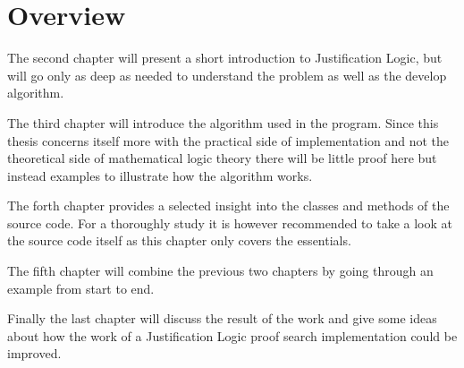 \section{Overview}
The second chapter will present a short introduction to Justification Logic, but will go only as deep as needed to understand the problem as well as the develop algorithm.
\par
The third chapter will introduce the algorithm used in the program. Since this thesis concerns itself more with the practical side of implementation and not the theoretical side of mathematical logic theory there will be little proof here but instead examples to illustrate how the algorithm works.
\par
The forth chapter provides a selected insight into the classes and methods of the source code. For a thoroughly study it is however recommended to take a look at the source code itself as this chapter only covers the essentials. 
\par
The fifth chapter will combine the previous two chapters by going through an example from start to end.
\par
Finally the last chapter will discuss the result of the work and give some ideas about how the work of a Justification Logic proof search implementation could be improved. 